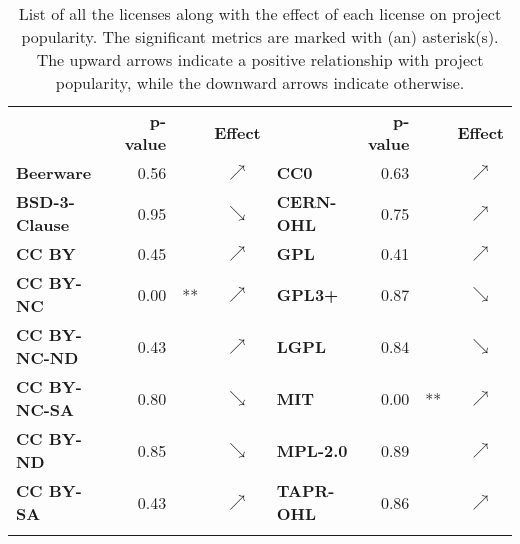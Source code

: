 \begin{table}[t]
	\scriptsize
	\centering
	\caption{List of all the licenses along with the effect of each license on project popularity. The significant metrics are marked with (an) asterisk(s). The upward arrows indicate a positive relationship with project popularity, while the downward arrows indicate otherwise.}
	\setlength{\tabcolsep}{2pt}
	\label{table:license}
	\begin{tabularx}{0.8\columnwidth}{>{\bfseries}lrlc||>{\bfseries}lrlc}
		\toprule
		\multirow{2}{*}{License}      & \multirow{2}{*}{\textbf{p-value}}  &    & \multirow{2}{*}{\textbf{Effect}}     & \multirow{2}{*}{License}  & \multirow{2}{*}{\textbf{p-value}}  &    & \multirow{2}{*}{\textbf{Effect}}     \\
		&&&&&&&\\ \midrule\midrule
		Beerware     & 0.56 &    & $\nearrow$ & CC0      & 0.63 &    & $\nearrow$ \\
		BSD-3-Clause & 0.95 &    & $\searrow$ & CERN-OHL & 0.75 &    & $\nearrow$ \\
		CC BY        & 0.45 &    & $\nearrow$ & GPL      & 0.41 &    & $\nearrow$ \\
		CC BY-NC     & 0.00 & ** & $\nearrow$ & GPL3+    & 0.87 &    & $\searrow$ \\
		CC BY-NC-ND  & 0.43 &    & $\nearrow$ & LGPL     & 0.84 &    & $\searrow$ \\
		CC BY-NC-SA  & 0.80 &    & $\searrow$ & MIT      & 0.00 & ** & $\nearrow$ \\
		CC BY-ND     & 0.85 &    & $\searrow$ & MPL-2.0  & 0.89 &    & $\nearrow$ \\
		CC BY-SA     & 0.43   &    & $\nearrow$ &TAPR-OHL          &  0.86        &    & $\nearrow$          \\ \bottomrule
		\multicolumn{8}{l}{$p-value$ codes:  `***'$<0$, `**'$<0.001$, `*'$<0.01$, `.'$<0.05$}\\ 
	\end{tabularx}
\vspace{-0.1cm}
\end{table}
